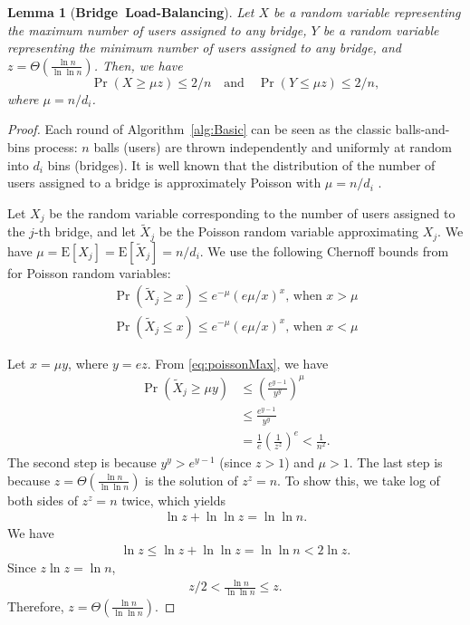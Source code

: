 \documentclass[letterpaper,twocolumn,10pt]{article}
\newcommand{\E}{\mathbf{\mathrm{E}}}
\newtheorem{lemma}{Lemma}
\newcommand{\sfsize}{\fontsize{0.68\baselineskip}{0.68\baselineskip}\selectfont}
\newcommand{\sans}[1]{\textbf{\textsf{\sfsize \mbox{#1}}}}
\begin{document}
\begin{lemma}[\sans{Bridge Load-Balancing}]
	Let $X$ be a random variable representing the maximum number of users assigned to any bridge, $Y$ be a random variable representing the minimum number of users assigned to any bridge, and $z = \Theta\left(\frac{\ln{n}}{\ln{\ln{n}}}\right)$. Then, we have 
	\[
	\Pr\left(X \geq \mu z\right) \leq 2/n \quad \text{and} \quad 
	\Pr\left(Y \leq \mu z\right) \leq 2/n,
	\]
	where ${\mu = n/d_i}$.
\end{lemma}
\begin{proof}
	Each round of Algorithm~\ref{alg:Basic} can be seen as the classic balls-and-bins process: $n$ balls (users) are thrown independently and uniformly at random into $d_i$ bins (bridges). It is well known that the distribution of the number of users assigned to a bridge is approximately Poisson with ${\mu = n/d_i}$ \cite[Chapter~5]{Michael2005}.
	
	Let $X_j$ be the random variable corresponding to the number of users assigned to the $j$-th bridge, and let $\tilde{X}_j$ be the Poisson random variable approximating $X_j$. We have ${\mu = \E[X_j] = \E[\tilde{X}_j] = n/d_i}$. We use the following Chernoff bounds from \cite[Chapter~5]{Michael2005} for Poisson random variables:
	\begin{align}
	\Pr(\tilde{X}_j \geq x) \leq e^{-\mu}(e\mu/x)^x \text{, when } x > \mu \label{eq:poissonMax}\\
	\Pr(\tilde{X}_j \leq x) \leq e^{-\mu}(e\mu/x)^x \text{, when } x < \mu \label{eq:poissonMin}
	\end{align}
	
	\noindent Let ${x = \mu y}$, where ${y = ez}$. From \eqref{eq:poissonMax}, we have
	\begin{align}
	\Pr(\tilde{X}_j \geq \mu y) &\leq \left(\frac{e^{y-1}}{y^y}\right)^\mu \nonumber \\
	&\leq \frac{e^{y-1}}{y^y} \nonumber \\ 
	&= \frac{1}{e}\left(\frac{1}{z^z}\right)^e < \frac{1}{n^2}. \label{eq:approxBound}
	\end{align}
	The second step is because ${y^y > e^{y-1}}$ (since ${z > 1}$) and ${\mu > 1}$. The last step is because ${z = \Theta\left(\frac{\ln{n}}{\ln{\ln{n}}}\right)}$ is the solution of ${z^z = n}$. To show this, we take log of both sides of ${z^z = n}$ twice, which yields
	\begin{align*}
	\ln{z} + \ln{\ln{z}} = \ln{\ln{n}}.
	\end{align*}
	We have
	\begin{align*}
	\ln{z} \leq \ln{z} + \ln{\ln{z}} = \ln{\ln{n}} < 2\ln{z}.
	\end{align*}
	Since $z\ln{z} = \ln{n}$,
	\begin{align*}
	z/2 < \frac{\ln{n}}{\ln{\ln{n}}} \leq z.
	\end{align*}
	Therefore, $z = \Theta\left(\frac{\ln{n}}{\ln{\ln{n}}}\right)$. 
	

\end{proof}
\end{document}
